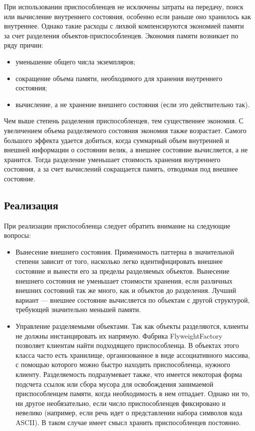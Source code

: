 При использовании приспособленцев не исключены затраты на передачу,
поиск или вычисление внутреннего состояния, особенно если раньше оно хранилось
как внутреннее.
Однако такие расходы с лихвой компенсируются экономией памяти за счет разделения 
объектов-приспособленцев.
Экономия памяти возникает по ряду причин:
\begin{itemize}
\item уменьшение общего числа экземпляров;
\item сокращение объема памяти, необходимого для хранения внутреннего состояния;
\item вычисление, а не хранение внешнего состояния (если это действительно так).
\end{itemize}

Чем выше степень разделения приспособленцев, тем существеннее экономия.
С увеличением объема разделяемого состояния экономия также возрастает.
Самого большого эффекта удается добиться, когда суммарный объем внутренней
и внешней информации о состоянии велик, а внешнее состояние вычисляется, а не
хранится. Тогда разделение уменьшает стоимость хранения внутреннего состояния,
а за счет вычислений сокращается память, отводимая под внешнее состояние.

\subsection{Реализация}

При реализации приспособленца следует обратить внимание на следующие
вопросы:
\begin{itemize}
\item
  Вынесение внешнего состояния. 
  Применимость паттерна в значительной степени зависит от того,
  насколько легко идентифицировать внешнее состояние и вынести его за
  пределы разделяемых объектов. Вынесение внешнего состояния не уменьшает
  стоимости хранения, если различных внешних состояний так же много,
  как и объектов до разделения. Лучший вариант --- внешнее состояние
  вычисляется по объектам с другой структурой, требующей значительно меньшей памяти.

\item
  Управление разделяемыми объектами. Так как объекты разделяются, 
  клиенты не должны инстанцировать их напрямую. Фабрика FlyweightFactory
  позволяет клиентам найти подходящего приспособленца. В объектах этого
  класса часто есть хранилище, организованное в виде ассоциативного массива,
  с помощью которого можно быстро находить приспособленца, нужного
  клиенту. 
  Разделяемость подразумевает также, что имеется некоторая форма подсчета
  ссылок или сбора мусора для освобождения занимаемой приспособленцем
  памяти, когда необходимость в нем отпадает. Однако ни то, ни другое
  необязательно, если число приспособленцев фиксировано и невелико (например,
  если речь идет о представлении набора символов кода ASCII).
  В таком случае имеет смысл хранить приспособленцев постоянно.
\end{itemize}

